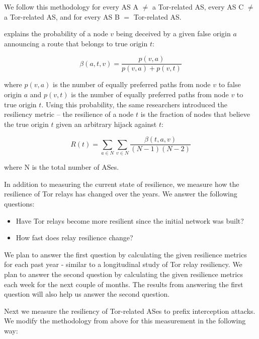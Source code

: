 We follow this methodology for every AS A $\neq$ a Tor-related AS, every AS C $\neq$ a Tor-related AS, and for every AS B $=$ Tor-related AS.

\cite{lad2007understanding} explains the probability of a node $v$ being deceived by a given false origin $a$ announcing a route that belongs to true origin $t$:

\[\beta(a,t,v) = \frac{p(v,a)}{p(v,a) + p(v,t)}\]

where $p(v,a)$ is the number of equally preferred paths from node $v$ to false origin $a$ and $p(v,t)$ is the number of equally preferred paths from node $v$ to true origin $t$.  Using this probability, the same researchers introduced the resiliency metric -- the resilience of a node $t$ is the fraction of nodes that believe the true origin $t$ given an arbitrary  hijack against $t$:

\[R(t) = \sum_{a \in N} \sum_{v \in N} \frac{\beta(t,a,v)}{(N-1)(N-2)}\]

where N is the total number of ASes.



In addition to measuring the current state of resilience, we measure how the resilience of Tor relays has changed over the years.  We answer the following questions:

\begin{itemize}
\item Have Tor relays become more resilient since the initial network was built?
\item How fast does relay resilience change? 
\end{itemize}

We plan to answer the first question by calculating the given resilience metrics for each past year - similar to a longitudinal study of Tor relay resiliency.  We plan to answer the second question by calculating the given resilience metrics each week for the next couple of months.  The results from answering the first question will also help us answer the second question.

Next we measure the resiliency of Tor-related ASes to prefix interception attacks.  We modify the methodology from above for this measurement in the following way:

